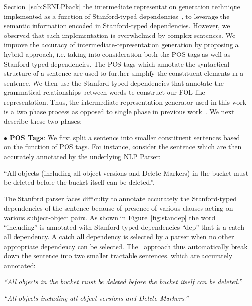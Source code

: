 Section~\ref{sub:SENLPback} the intermediate representation generation technique implemented as a function of Stanford-typed dependencies~\cite{Marneffe06LREC,Marneffe08COLING,KleinNIPS03}, to leverage the semantic information encoded in Stanford-typed dependencies.
However, we observed that such implementation is overwhelmed by complex sentences.
We improve the accuracy of intermediate-representation generation by proposing a hybrid approach, i.e. taking into consideration both the POS tags as well as Stanford-typed dependencies.
The POS tags which annotate the syntactical structure of a sentence are used to further simplify the constituent elements in a sentence. 
We then use the Stanford-typed dependencies that annotate the grammatical relationships between words to construct our FOL like representation.
Thus, the intermediate representation generator used in this work is a two phase process as opposed to single phase in previous work~\cite{pandita12:inferring, pandita13:WHYPER}. 
We next describe these two phases:

{\small $\bullet$} \textbf{POS Tags}: We first split a sentence into smaller constituent sentences based on the function of POS tags. 
For instance, consider the sentence which are then accurately annotated by the underlying NLP Parser:

\begin{center}
\scriptsize``All objects (including all object versions and Delete Markers) in the bucket must be deleted before the bucket itself can be deleted.''. \normalsize
\end{center}

The Stanford parser faces difficulty to annotate accurately the Stanford-typed dependencies of the sentence because of presence of various clauses acting on various subject-object pairs.
As shown in Figure~\ref{fig:standep} the word ``including'' is annotated with Stanford-typed dependencies ``dep'' that is a catch all dependency. A catch all dependency is selected by a parser when no other appropriate dependency can be selected.
The \tool\ approach thus automatically break down the sentence into two smaller tractable sentences, which are accurately annotated:

\begin{center}
\scriptsize \textit{``All objects in the bucket must be deleted before the bucket itself can be deleted.}''
	
\textit{``All objects including all object versions and Delete Markers.''}\normalsize 
\end{center} 


